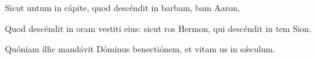 \item {}

\item \psnonrepetitur{}Sicut untum in cápite,\psstar{} quod descéndit in barbam, bam Aaron,

\item Quod descéndit in oram vestiti eius:\psstar{} sicut ros Hermon, qui descéndit in tem Sion.

\item Quóniam illic mandávit Dóminus benectiónem,\psstar{} et vitam us in sǽculum.
